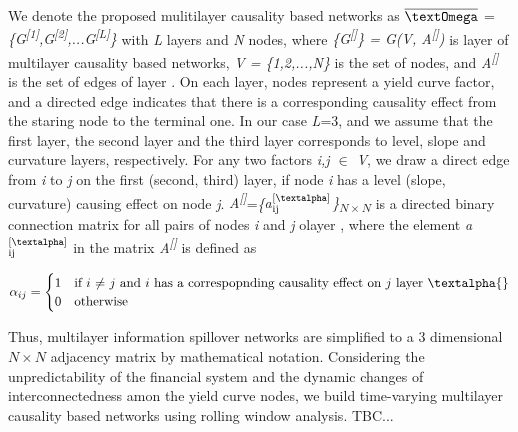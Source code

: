 \documentclass{article}
\begin{document}
We denote the proposed mulitilayer causality based networks as $\overline{\mbox{\textOmega}}$ = \textit{\{G\textsuperscript{[1]},G\textsuperscript{[2]},...G\textsuperscript{[L]}\}}
with \textit{L} layers and \textit{N} nodes, where \textit{\{G\textsuperscript{[\textalpha]}\} = G(V, A\textsuperscript{[\textalpha]})} is layer \textit{\textalpha{}} of multilayer causality based networks, \textit{V = \{1,2,...,N\}}
is the set of nodes, and  \textit{A\textsuperscript{[\textalpha]}} is the set of edges of layer \textit{\textalpha}. On each layer, nodes represent a yield curve factor, and a directed edge indicates that there is a corresponding causality effect from the staring node to the terminal one. In our case \textit{L}=3, and we assume that the first layer, the second layer and the third layer corresponds to level, slope and curvature layers, respectively.
For any two factors \textit{i,j $\in$ V}, we draw a direct edge from \textit{i} to \textit{j} on the first (second, third) layer, if node \textit{i} has a level (slope, curvature) causing effect on node \textit{j}.
\textit{A\textsuperscript{[\textalpha]}}=\textit{\{{a$^{\text{[\textalpha]}}_{\text{ij}}$\}\textsubscript{$N\times N$}}} is a directed binary connection matrix for all pairs of nodes \textit{i} and \textit{j} olayer \textit{\textalpha{}}, where the element \textit{a$^{\text{[\textalpha]}}_{\text{ij}}$} in the matrix \textit{A\textsuperscript{[\textalpha]}} is defined as

\begin{equation}
  \alpha_{ij} =
    \begin{cases}
      1 & \text{if $i$ $\neq$ $j$ and $i$ has a correspopnding causality effect on $j$ layer \textalpha{}}\\
      0 & \text{otherwise}
    \end{cases}       
\end{equation}

Thus, multilayer information spillover networks are simplified to a 3 dimensional $N\times N$ adjacency matrix by mathematical notation. Considering the unpredictability of the financial system and the dynamic changes of interconnectedness amon the yield curve nodes, we build time-varying multilayer causality based networks using rolling window analysis. TBC...
\end{document}

